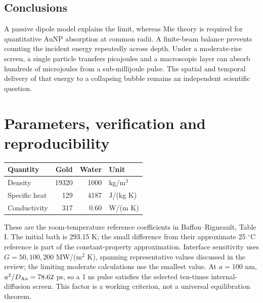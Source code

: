 \documentclass[10pt,a4paper]{article}
\begin{document}
\subsection*{Conclusions}
A passive dipole model explains the limit, whereas Mie theory is required for quantitative AuNP absorption at common radii. A finite-beam balance prevents counting the incident energy repeatedly across depth. Under a moderate-rise screen, a single particle transfers picojoules and a macroscopic layer can absorb hundreds of microjoules from a sub-millijoule pulse. The spatial and temporal delivery of that energy to a collapsing bubble remains an independent scientific question.
\newpage

\appendix
\section{Parameters, verification and reproducibility}
\begin{center}\small
\begin{tabular}{lrrl}\toprule
Quantity & Gold & Water & Unit\\\midrule
Density &19320&1000&kg/m$^3$\\
Specific heat &129&4187&J/(kg K)\\
Conductivity &317&0.60&W/(m K)\\\bottomrule
\end{tabular}
\end{center}
These are the room-temperature reference coefficients in Baffou--Rigneault, Table I. The initial bath is 293.15 K; the small difference from their approximate 25 $^\circ$C reference is part of the constant-property approximation. Interface sensitivity uses $G=50,100,200$ MW/(m$^2$ K), spanning representative values discussed in the review; the limiting moderate calculations use the smallest value. At $a=100$ nm, $a^2/D_{\mathrm{Au}}=78.62$ ps, so a 1 ns pulse satisfies the selected ten-times internal-diffusion screen. This factor is a working criterion, not a universal equilibration theorem.
\end{document}
